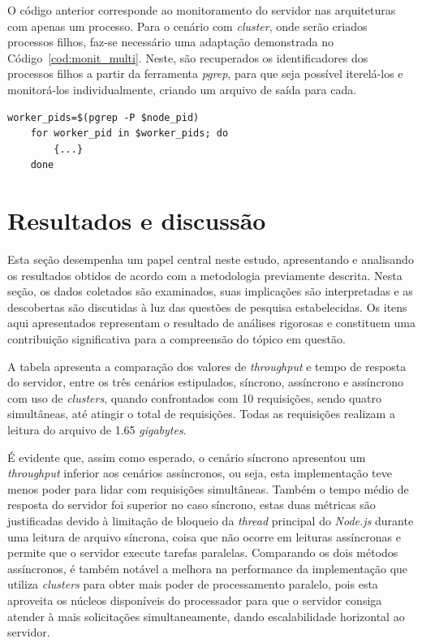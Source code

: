 \documentclass[12pt]{article}
\begin{document}
O código anterior corresponde ao monitoramento do servidor nas arquiteturas com apenas um processo. Para o cenário
com \textit{cluster}, onde serão criados processos filhos, faz-se necessário uma adaptação 
demonstrada no Código~\ref{cod:monit_multi}. Neste, são recuperados os identificadores dos processos filhos 
a partir da ferramenta \textit{pgrep}, para que seja possível iterelá-los e monitorá-los individualmente, 
criando um arquivo de saída para cada.

\begin{lstlisting}[caption={\textit{Script} para monitrar processos \textit{multi thread}}, label=cod:monit_multi]
	worker_pids=$(pgrep -P $node_pid)
	for worker_pid in $worker_pids; do
		{...}
	done
\end{lstlisting}


\section{Resultados e discussão}

Esta seção desempenha um papel central neste estudo, apresentando e analisando os resultados obtidos de 
acordo com a metodologia previamente descrita. Nesta seção, os dados coletados são examinados, suas implicações são interpretadas 
e as descobertas são discutidas à luz das questões de pesquisa estabelecidas. Os itens aqui apresentados representam o 
resultado de análises rigorosas e constituem uma contribuição significativa para a compreensão do tópico em questão.

A tabela \cite{tab:metrics} apresenta a comparação dos valores de \textit{throughput} e tempo de resposta do servidor,
entre os três cenários estipulados, síncrono, assíncrono e assíncrono com uso de \textit{clusters}, quando confrontados
com 10 requisições, sendo quatro simultâneas, até atingir o total de requisições. Todas as requisições realizam a leitura
do arquivo de 1.65 \textit{gigabytes}. 

É evidente que, assim como
esperado, o cenário síncrono apresentou um \textit{throughput} inferior aos cenários assíncronos, ou seja, esta implementação
teve menos poder para lidar com requisições simultâneas. Também o tempo médio de resposta do servidor foi superior no caso
síncrono, estas duas métricas são justificadas devido à limitação de bloqueio da \textit{thread} principal do 
\textit{Node.js} durante uma leitura de arquivo síncrona, coisa que não ocorre em leituras assíncronas e permite que o
servidor execute tarefas paralelas. Comparando os dois métodos assíncronos, é também notável a melhora na performance da 
implementação que utiliza \textit{clusters} para obter mais poder de processamento paralelo, pois esta aproveita
os núcleos disponíveis do processador para que o servidor consiga atender à mais solicitações simultaneamente,
dando escalabilidade horizontal ao servidor.
\end{document}
